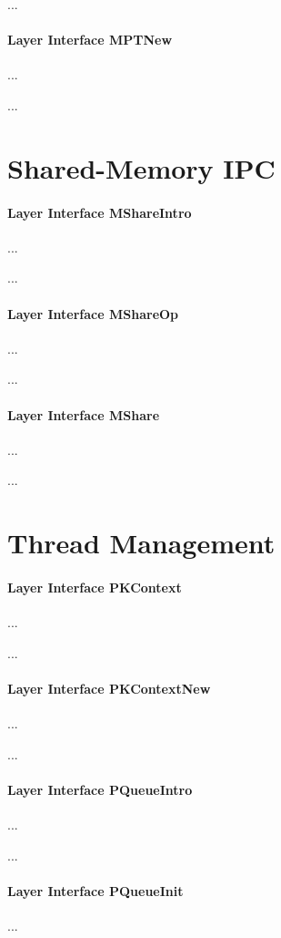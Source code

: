 ...

\paragraph{Layer Interface MPTNew}
...

...

\section{Shared-Memory IPC}

\paragraph{Layer Interface MShareIntro}
...

...

\paragraph{Layer Interface MShareOp}
...

...

\paragraph{Layer Interface MShare}
...

...

\section{Thread Management}

\paragraph{Layer Interface PKContext}
...

...

\paragraph{Layer Interface PKContextNew}
...

...

\paragraph{Layer Interface PQueueIntro}
...

...

\paragraph{Layer Interface PQueueInit}
...

